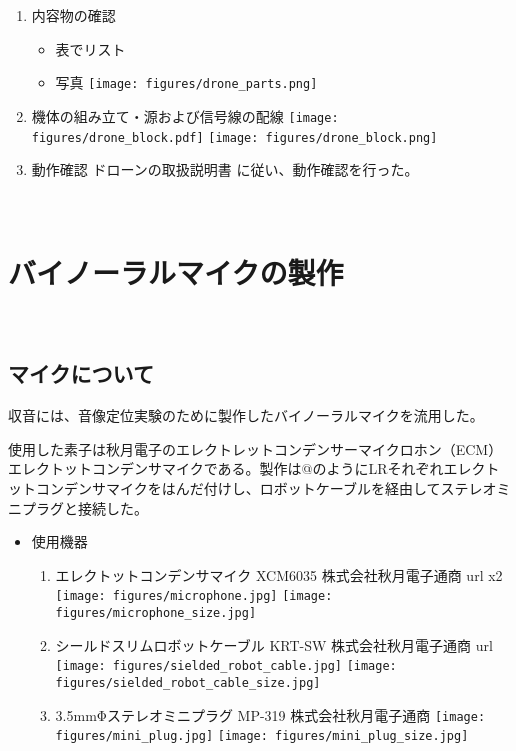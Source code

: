 \begin{enumerate}
\renewcommand{\labelenumi}{(\arabic{enumi})}
\item
  内容物の確認

  \begin{itemize}
  \tightlist
  \item
    表でリスト
  \item
    写真 \texttt{[image: figures/drone\_parts.png]}
  \end{itemize}
\item
  機体の組み立て・源および信号線の配線
  \texttt{[image: figures/drone\_block.pdf]}
  \texttt{[image: figures/drone\_block.png]}
\item
  動作確認
  \cite{http://www.lynxmotion.com/images/document/PDF/LynxmotionUAV-QuadrinoNano-UserGuideV1.1.pdf}{ドローンの取扱説明書}
  に従い、動作確認を行った。
\end{enumerate}

\
\section{バイノーラルマイクの製作}\label{binaural-mic}

\
\subsection{マイクについて}\label{about-mic}

収音には、音像定位実験のために製作したバイノーラルマイクを流用した。

使用した素子は秋月電子のエレクトレットコンデンサーマイクロホン（ECM）\cite{http://akizukidenshi.com/catalog/g/gP-08181/}{エレクトットコンデンサマイク}である。製作は@のようにLRそれぞれエレクトットコンデンサマイクをはんだ付けし、ロボットケーブルを経由してステレオミニプラグと接続した。

\begin{itemize}
\tightlist
\item
  使用機器

  \begin{enumerate}
  \renewcommand{\labelenumi}{(\arabic{enumi})}
  \item
    エレクトットコンデンサマイク XCM6035 株式会社秋月電子通商
    \cite{http://akizukidenshi.com/catalog/g/gP-08181/}{url} x2
    \texttt{[image: figures/microphone.jpg]}
    \texttt{[image: figures/microphone\_size.jpg]}
  \item
    シールドスリムロボットケーブル KRT-SW 株式会社秋月電子通商
    \cite{http://akizukidenshi.com/catalog/g/gP-07457/}{url}
    \texttt{[image: figures/sielded\_robot\_cable.jpg]}
    \texttt{[image: figures/sielded\_robot\_cable\_size.jpg]}
  \item
    3.5mmΦステレオミニプラグ MP-319 株式会社秋月電子通商
    \texttt{[image: figures/mini\_plug.jpg]}
    \texttt{[image: figures/mini\_plug\_size.jpg]}
  \end{enumerate}
\end{itemize}

